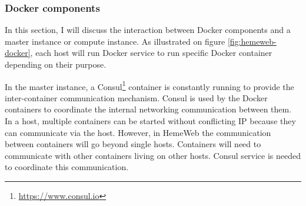 \subsubsection{Docker components}

\vspace{1cm}

\noindent%
\begin{minipage}{\linewidth}%
\label{fig:hemeweb-docker}%
\end{minipage}

\vspace{1cm}

In this section, I will discuss the interaction between Docker components and a master instance or compute instance. As illustrated on figure \ref{fig:hemeweb-docker}, each host will run Docker service to run specific Docker container depending on their purpose.

In the master instance, a Consul\footnote{\url{https://www.consul.io}}  container is constantly running to provide the inter-container communication mechanism. Consul is used by the Docker containers to coordinate the internal networking communication between them. In a host, multiple containers can be started without conflicting IP because they can communicate via the host. However, in HemeWeb the communication between containers will go beyond single hosts. Containers will need to communicate with other containers living on other hosts. Consul service is needed to coordinate this communication.

